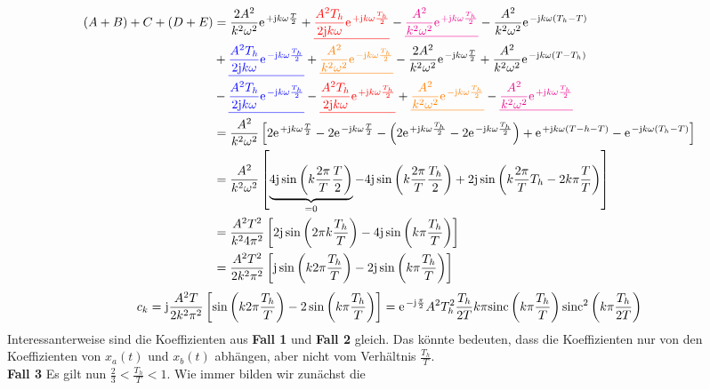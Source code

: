 \documentclass[11pt,a4paper,DIV=12]{scrartcl}
\newcommand{\ured}[1]{\textcolor{red}{\underline{#1}}}
\newcommand{\ublue}[1]{\textcolor{blue}{\underline{#1}}}
\newcommand{\uorange}[1]{\textcolor{orange}{\underline{#1}}}
\newcommand{\umagenta}[1]{\textcolor{magenta}{\underline{#1}}}
\newcommand{\sinc}{\mathrm{sinc}}
\begin{document}
\begin{align}
	(A+B)+C+(D+E)&=\frac{2A^2}{k^2\omega^2}\e^{+\im k \omega \frac{T}{2}}+\ured{\frac{A^2T_h}{2\im k \omega}\e^{+\im k \omega \frac{T_h}{2}}}-\umagenta{\frac{A^2}{k^2\omega^2}\e^{+\im k \omega\frac{T_h}{2}}}-\frac{A^2}{k^2\omega^2}\e^{-\im k \omega (T_h-T)}\nonumber \\
	&+\ublue{\frac{A^2T_h}{2\im k \omega}\e^{-\im k \omega \frac{T_h}{2}}}+\uorange{\frac{A^2}{ k^2 \omega^2}\e^{-\im k \omega \frac{T_h}{2}}}-\frac{2A^2}{k^2\omega^2}\e^{-\im k \omega \frac{T}{2}}+\frac{A^2}{k^2\omega^2}\e^{-\im k \omega (T-T_h)}\nonumber \\
	&-\ublue{\frac{A^2T_h}{2\im k \omega}\e^{-\im k \omega \frac{T_h}{2}}}-\ured{\frac{A^2T_h}{2\im k \omega}\e^{+\im k \omega \frac{T_h}{2}}}+\uorange{\frac{A^2}{k^2\omega^2}\e^{-\im k \omega \frac{T_h}{2}}}-\umagenta{\frac{A^2}{k^2\omega^2}\e^{+\im k \omega \frac{T_h}{2}}}\nonumber \\
	&=\frac{A^2}{k^2\omega^2}\left [2\e^{+\im k \omega\frac{T}{2}}-2\e^{-\im k \omega \frac{T}{2}}-\left (2\e^{+\im k \omega \frac{T_h}{2}}-2\e^{-\im k \omega \frac{T_h}{2}}\right )+\e^{+\im k \omega(T-h-T)}-\e^{-\im k \omega(T_h-T)}\right ]\nonumber \\
	&=\frac{A^2}{k^2\omega^2}\left [\underbrace{4\im\sin\left(k\frac {2\pi}{T}\frac{T}{2}\right)}_{=0}-4\im\sin\left(k \frac{2\pi}{T}\frac{T_h}{2}\right)+2\im\sin\left(k\frac{2\pi}{T}T_h-2k\pi\frac{T}{T}\right) \right ]\nonumber \\
	&=\frac{A^2T^2}{k^24\pi^2}\left [2\im\sin\left(2\pi k \frac{T_h}{T}\right)-4\im\sin\left(k\pi\frac{T_h}{T}\right)\right ]\nonumber \\
	&=\frac{A^2T^2}{2k^2\pi^2}\left [\im\sin\left(k2\pi\frac{T_h}{T}\right)-2\im\sin\left(k\pi\frac{T_h}{T}\right)\right ]
\end{align}
%
%
%
\begin{align}
	c_k=\im\frac{A^2T}{2k^2\pi^2}\left [\sin\left(k2\pi\frac{T_h}{T}\right)-2\sin\left(k\pi\frac{T_h}{T}\right)\right]=\e^{-\im\frac{\pi}{2}}A^2T_h^2\frac{T_h}{2T}k\pi\sinc\left(k\pi\frac{T_h}{T}\right)\sinc^2\left(k\pi\frac{T_h}{2T}\right)
\end{align}
%
%
Interessanterweise sind die Koeffizienten aus \textbf{Fall 1} und
\textbf{Fall 2} gleich.
%
Das könnte bedeuten, dass die Koeffizienten nur von den Koeffizienten von
$x_{a}(t)$ und $x_{b}(t)$ abhängen, aber nicht vom Verhältnis $\frac{T_h}{T}$.
%
\\
\textbf{Fall 3}
Es gilt nun $\frac{2}{3} < \frac{T_h}{T} < 1$. Wie immer bilden wir zunächst die
\end{document}
